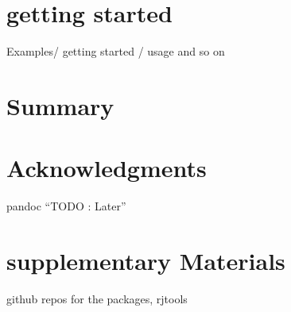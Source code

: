\hypertarget{getting-started}{%
\section{getting started}\label{getting-started}}

Examples/ getting started / usage and so on

\hypertarget{summary}{%
\section{Summary}\label{summary}}

\hypertarget{acknowledgments}{%
\section{Acknowledgments}\label{acknowledgments}}

pandoc
``TODO : Later''

\hypertarget{supplementary-materials}{%
\section{supplementary Materials}\label{supplementary-materials}}

github repos for the packages, rjtools



\address{%
Abhishek Ulayil\\
Student, Institute of Actuaries of India\\%
Mumbai, India\\
%
%
\textit{ORCiD: \href{https://orcid.org/0009-0000-6935-8690}{0009-0000-6935-8690}}\\%
\href{mailto:perricoq@outlook.com}{\nolinkurl{perricoq@outlook.com}}%
}
